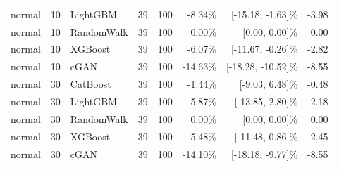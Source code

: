 \documentclass[11pt,a4paper]{article}
\begin{document}
\begin{center}
\begin{tabular}{lrlrrrrr}
normal & 10 & LightGBM & 39 & 100 & -8.34\% & [-15.18, -1.63]\% & -3.98 \\
normal & 10 & RandomWalk & 39 & 100 & 0.00\% & [0.00, 0.00]\% & 0.00 \\
normal & 10 & XGBoost & 39 & 100 & -6.07\% & [-11.67, -0.26]\% & -2.82 \\
normal & 10 & cGAN & 39 & 100 & -14.63\% & [-18.28, -10.52]\% & -8.55 \\
\addlinespace
normal & 30 & CatBoost & 39 & 100 & -1.44\% & [-9.03, 6.48]\% & -0.48 \\
normal & 30 & LightGBM & 39 & 100 & -5.87\% & [-13.85, 2.80]\% & -2.18 \\
normal & 30 & RandomWalk & 39 & 100 & 0.00\% & [0.00, 0.00]\% & 0.00 \\
normal & 30 & XGBoost & 39 & 100 & -5.48\% & [-11.48, 0.86]\% & -2.45 \\
normal & 30 & cGAN & 39 & 100 & -14.10\% & [-18.18, -9.77]\% & -8.55 \\
\bottomrule
\end{tabular}
\end{center}
\end{document}
